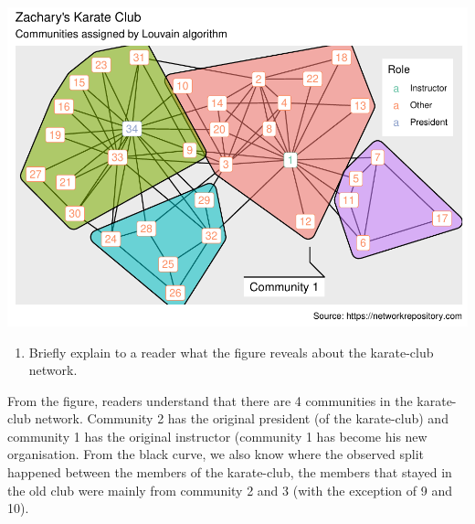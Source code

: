 \documentclass[
]{article}
\providecommand{\tightlist}{%
  \setlength{\itemsep}{0pt}\setlength{\parskip}{0pt}}
\begin{document}
\begin{center}\includegraphics{Karate-Tasks_files/figure-latex/unnamed-chunk-12-1} \end{center}

\begin{enumerate}
\def\labelenumi{(\arabic{enumi})}
\setcounter{enumi}{11}
\tightlist
\item
  Briefly explain to a reader what the figure reveals about the
  karate-club network.
\end{enumerate}

\Ans From the figure, readers understand that there are 4 communities in
the karate-club network. Community 2 has the original president (of the
karate-club) and community 1 has the original instructor (community 1
has become his new organisation. From the black curve, we also know
where the observed split happened between the members of the
karate-club, the members that stayed in the old club were mainly from
community 2 and 3 (with the exception of 9 and 10).
\end{document}
